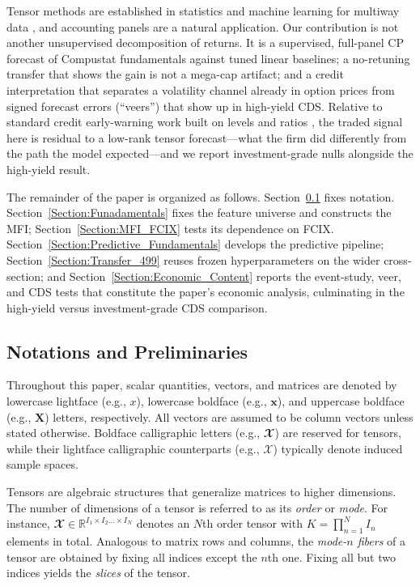 \documentclass[pdflatex,sn-mathphys-num]{sn-jnl}%
\theoremstyle{thmstyleone}%
\theoremstyle{thmstyletwo}%
\theoremstyle{thmstylethree}%
\begin{document}
Tensor methods are established in statistics and machine learning for multiway data \citep{zhou2013tensor,hoff2015multilinear,lock2018tensor,kossaifi2019tensorly}, and accounting panels are a natural application. Our contribution is not another unsupervised decomposition of returns. It is a supervised, full-panel CP forecast of Compustat fundamentals against tuned linear baselines; a no-retuning transfer that shows the gain is not a mega-cap artifact; and a credit interpretation that separates a volatility channel already in option prices from signed forecast errors (``veers'') that show up in high-yield CDS. Relative to standard credit early-warning work built on levels and ratios \citep{bharath2008forecasting}, the traded signal here is residual to a low-rank tensor forecast---what the firm did differently from the path the model expected---and we report investment-grade nulls alongside the high-yield result.

The remainder of the paper is organized as follows. Section~\ref{Intro:4} fixes notation. Section~\ref{Section:Funadamentals} fixes the feature universe and constructs the MFI; Section~\ref{Section:MFI_FCIX} tests its dependence on FCIX. Section~\ref{Section:Predictive_Fundamentals} develops the predictive pipeline; Section~\ref{Section:Transfer_499} reuses frozen hyperparameters on the wider cross-section; and Section~\ref{Section:Economic_Content} reports the event-study, veer, and CDS tests that constitute the paper's economic analysis, culminating in the high-yield versus investment-grade CDS comparison.

\subsection{Notations and Preliminaries}
\label{Intro:4}
Throughout this paper, scalar quantities, vectors, and matrices are denoted by lowercase lightface (e.g., $x$), lowercase boldface (e.g., $\mathbf{x}$), and uppercase boldface (e.g., $\mathbf{X}$) letters, respectively. All vectors are assumed to be column vectors unless stated otherwise. Boldface calligraphic letters (e.g., $\mathbfcal{X}$) are reserved for tensors, while their lightface calligraphic counterparts (e.g., $\mathcal{X}$) typically denote induced sample spaces.

Tensors are algebraic structures that generalize matrices to higher dimensions. The number of dimensions of a tensor is referred to as its \textit{order} or \textit{mode}. For instance, $\mathbfcal{X} \in \mathbb{R}^{I_1 \times I_2 \dots \times I_N}$ denotes an $N$th order tensor with $K = \prod_{n=1}^{N} I_n$ elements in total. Analogous to matrix rows and columns, the \textit{mode-$n$ fibers} of a tensor are obtained by fixing all indices except the $n$th one. Fixing all but two indices yields the \textit{slices} of the tensor.
\end{document}
